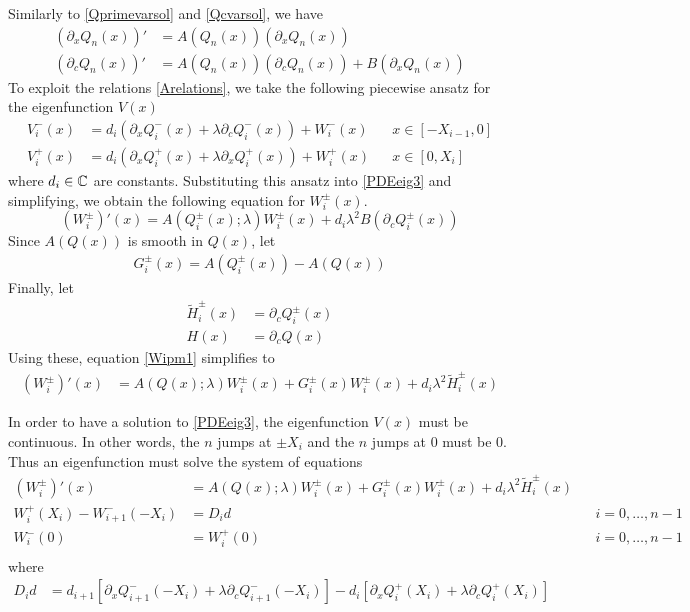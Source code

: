 \documentclass[thesis.tex]{subfiles}
\begin{document}
Similarly to \eqref{Qprimevarsol} and \eqref{Qcvarsol}, we have
\begin{equation}\label{Arelations}
\begin{aligned}
(\partial_x Q_n(x))' &= A(Q_n(x)) (\partial_x Q_n(x)) \\
(\partial_c Q_n(x))' &= A(Q_n(x)) (\partial_c Q_n(x)) + B (\partial_x Q_n(x)) 
\end{aligned}
\end{equation}
To exploit the relations \eqref{Arelations}, we take the following piecewise ansatz for the eigenfunction $V(x)$
\begin{equation}\label{Vpiecewise}
\begin{aligned}
V_i^-(x) &= d_i (\partial_x Q_i^-(x) + \lambda \partial_c Q_i^-(x)) + W_i^-(x) && x \in [-X_{i-1}, 0] \\
V_i^+(x) &= d_i (\partial_x Q_i^+(x) + \lambda \partial_x Q_i^+(x)) + W_i^+(x) && x \in [0, X_i] 
\end{aligned}
\end{equation}
where $d_i \in \mathbb{C}$ are constants. Substituting this ansatz into \eqref{PDEeig3} and simplifying, we obtain the following equation for $W_i^\pm(x)$.
\begin{equation}\label{Wipm1}
(W_i^\pm)'(x) = A(Q_i^\pm(x); \lambda) W_i^\pm(x) + d_i \lambda^2 B (\partial_c Q_i^\pm(x))
\end{equation}
Since $A(Q(x))$ is smooth in $Q(x)$, let 
\begin{align*}
G_i^\pm(x) = A(Q_i^\pm(x)) - A(Q(x))
\end{align*}
Finally, let
\begin{align*}
\tilde{H}_i^\pm(x) &= \partial_c Q_i^\pm(x) \\ 
H(x) &= \partial_c Q(x)
\end{align*}
Using these, equation \eqref{Wipm1} simplifies to
\begin{align}\label{Wipm2}
(W_i^\pm)'(x) &= A(Q(x); \lambda) W_i^\pm(x) + G_i^\pm(x) W_i^\pm(x) + d_i \lambda^2 \tilde{H}_i^\pm(x)
\end{align}

In order to have a solution to \eqref{PDEeig3}, the eigenfunction $V(x)$ must be continuous. In other words, the $n$ jumps at $\pm X_i$ and the $n$ jumps at $0$ must be 0. Thus an eigenfunction must solve the system of equations
\begin{align*}
(W_i^\pm)'(x) &= A(Q(x); \lambda) W_i^\pm(x) + G_i^\pm(x) W_i^\pm(x) + d_i \lambda^2 \tilde{H}_i^\pm(x) \\
W_i^+(X_i) - W_{i+1}^-(-X_i) &= D_i d && i = 0, \dots, n-1 \\
W_i^-(0) &= W_i^+(0) && i = 0, \dots, n-1  \\
\end{align*}
where
\begin{align}\label{defDid}
D_i d &= d_{i+1}[\partial_x Q_{i+1}^-(-X_i) + \lambda \partial_c Q_{i+1}^-(-X_i)]
- d_i [ \partial_x Q_i^+(X_i) + \lambda \partial_c Q_i^+(X_i) ] \\
\end{align}
\end{document}
